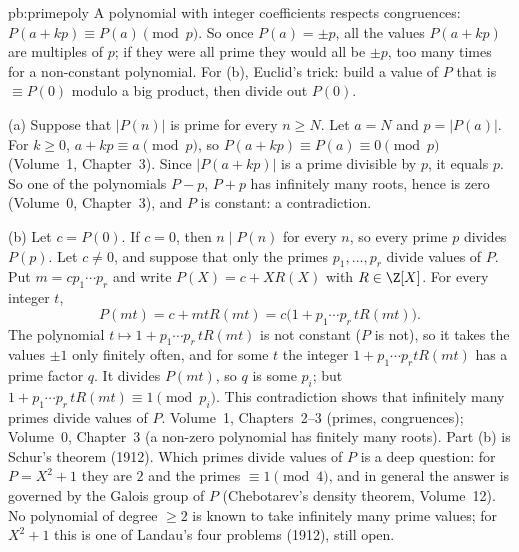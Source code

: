 \begin{solution}{pb:primepoly}
\idea A polynomial with integer coefficients respects congruences: $P(a+kp)\equiv P(a)\pmod p$. So once $P(a)=\pm p$, all the
values $P(a+kp)$ are multiples of $p$; if they were all prime they would all be $\pm p$, too many times for a non-constant
polynomial. For (b), Euclid's trick: build a value of $P$ that is $\equiv P(0)$ modulo a big product, then divide out
$P(0)$.

\writeup (a) Suppose that $|P(n)|$ is prime for every $n\ge N$. Let $a=N$ and $p=|P(a)|$. For $k\ge0$,
$a+kp\equiv a\pmod p$, so $P(a+kp)\equiv P(a)\equiv0\pmod p$ (Volume~1, Chapter~3). Since $|P(a+kp)|$ is a prime divisible by
$p$, it equals $p$. So one of the polynomials $P-p$, $P+p$ has infinitely many roots, hence is zero (Volume~0, Chapter~3), and
$P$ is constant: a contradiction.

(b) Let $c=P(0)$. If $c=0$, then $n\mid P(n)$ for every $n$, so every prime $p$ divides $P(p)$. Let $c\ne0$, and suppose that
only the primes $p_1,\dots,p_r$ divide values of $P$. Put $m=cp_1\cdots p_r$ and write $P(X)=c+XR(X)$ with $R\in\Z[X]$. For
every integer $t$,
\[
P(mt)=c+mtR(mt)=c\bigl(1+p_1\cdots p_r\,tR(mt)\bigr).
\]
The polynomial $t\mapsto1+p_1\cdots p_r\,tR(mt)$ is not constant ($P$ is not), so it takes the values $\pm1$ only finitely
often, and for some $t$ the integer $1+p_1\cdots p_rtR(mt)$ has a prime factor $q$. It divides $P(mt)$, so $q$ is some $p_i$;
but $1+p_1\cdots p_r\,tR(mt)\equiv1\pmod{p_i}$. This contradiction shows that infinitely many primes divide values of $P$.
\tools Volume~1, Chapters~2--3 (primes, congruences); Volume~0, Chapter~3 (a non-zero polynomial has finitely many roots).
\leads Part (b) is Schur's theorem (1912). Which primes divide values of $P$ is a deep question: for $P=X^2+1$ they are $2$
and the primes $\equiv1\pmod4$, and in general the answer is governed by the Galois group of $P$ (Chebotarev's density
theorem, Volume~12). No polynomial of degree $\ge2$ is known to take infinitely many prime values; for $X^2+1$ this is one of
Landau's four problems (1912), still open.
\end{solution}

